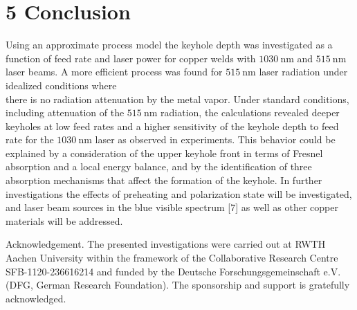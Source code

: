 \documentclass[10pt]{article}
\begin{document}
\section*{5 Conclusion}
Using an approximate process model the keyhole depth was investigated as a function of feed rate and laser power for copper welds with $1030 \mathrm{~nm}$ and $515 \mathrm{~nm}$ laser beams. A more efficient process was found for $515 \mathrm{~nm}$ laser radiation under idealized conditions where\\
there is no radiation attenuation by the metal vapor. Under standard conditions, including attenuation of the $515 \mathrm{~nm}$ radiation, the calculations revealed deeper keyholes at low feed rates and a higher sensitivity of the keyhole depth to feed rate for the $1030 \mathrm{~nm}$ laser as observed in experiments. This behavior could be explained by a consideration of the upper keyhole front in terms of Fresnel absorption and a local energy balance, and by the identification of three absorption mechanisms that affect the formation of the keyhole. In further investigations the effects of preheating and polarization state will be investigated, and laser beam sources in the blue visible spectrum [7] as well as other copper materials will be addressed.

Acknowledgement. The presented investigations were carried out at RWTH Aachen University within the framework of the Collaborative Research Centre SFB-1120-236616214 and funded by the Deutsche Forschungsgemeinschaft e.V. (DFG, German Research Foundation). The sponsorship and support is gratefully acknowledged.
\end{document}

